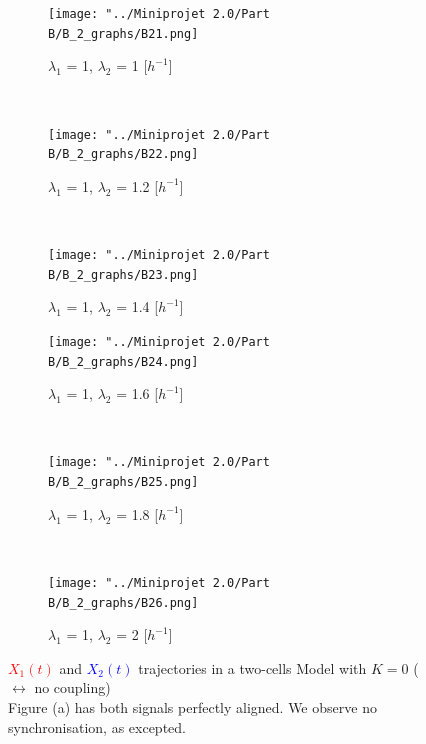 \documentclass[10pt,a4paper,oneside,twocolumn]{article}
\newcommand{\red}[1]{\textcolor{red}{#1}}
\newcommand{\blue}[1]{\textcolor{blue}{#1}}
\numberwithin{equation}{section} %
\begin{document}
    \begin{figure}
    \centering
	\begin{subfigure}[b]{0.32\textwidth}
	    \texttt{[image: "../Miniprojet 2.0/Part B/B\_2\_graphs/B21.png]}
	    \caption{$\lambda_1$ = 1, $\lambda_2$ = 1 [$h^{-1}$]}
	\end{subfigure}
	~ 
	\begin{subfigure}[b]{0.32\textwidth}
	    \texttt{[image: "../Miniprojet 2.0/Part B/B\_2\_graphs/B22.png]}
	    \caption{$\lambda_1$ = 1, $\lambda_2$ = 1.2 [$h^{-1}$]}
	\end{subfigure}
	~ 
	\begin{subfigure}[b]{0.32\textwidth}
	    \texttt{[image: "../Miniprojet 2.0/Part B/B\_2\_graphs/B23.png]}
	    \caption{$\lambda_1$ = 1, $\lambda_2$ = 1.4 [$h^{-1}$]}
	\end{subfigure}
	 
	\begin{subfigure}[b]{0.32\textwidth}
	    \texttt{[image: "../Miniprojet 2.0/Part B/B\_2\_graphs/B24.png]}
	    \caption{$\lambda_1$ = 1, $\lambda_2$ = 1.6 [$h^{-1}$]}
	\end{subfigure}
	~ 
	\begin{subfigure}[b]{0.32\textwidth}
	    \texttt{[image: "../Miniprojet 2.0/Part B/B\_2\_graphs/B25.png]}
	    \caption{$\lambda_1$ = 1, $\lambda_2$ = 1.8 [$h^{-1}$]}
	\end{subfigure}
	~ 
	\begin{subfigure}[b]{0.32\textwidth}
	    \texttt{[image: "../Miniprojet 2.0/Part B/B\_2\_graphs/B26.png]}
	    \caption{$\lambda_1$ = 1, $\lambda_2$ = 2 [$h^{-1}$]}
	\end{subfigure}

	\caption{\red{$X_1(t)$} and \blue{$X_2(t)$} trajectories in a two-cells Model with $K=0$ ($\leftrightarrow$ no coupling)\\
	Figure (a) has both signals perfectly aligned. We observe no synchronisation, as excepted.}
    \end{figure}
\end{document}
